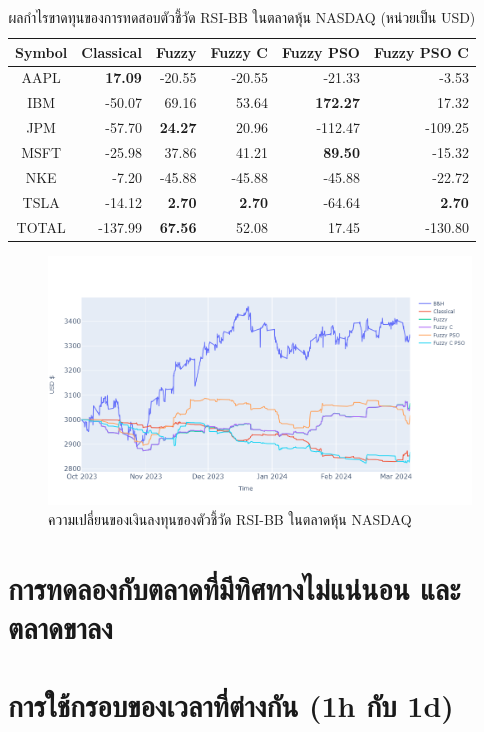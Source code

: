 \begin{table}[!ht]
    \centering
    \begin{tabular}{crrrrr}
        \hline
        \textbf{Symbol} & \textbf{Classical} & \textbf{Fuzzy} & \textbf{Fuzzy C} & \textbf{Fuzzy PSO} & \textbf{Fuzzy PSO C} \\ \hline
        AAPL            & \textbf{17.09}     & -20.55         & -20.55           & -21.33             & -3.53                \\ \hline
        IBM             & -50.07             & 69.16          & 53.64            & \textbf{172.27}    & 17.32                \\ \hline
        JPM             & -57.70             & \textbf{24.27} & 20.96            & -112.47            & -109.25              \\ \hline
        MSFT            & -25.98             & 37.86          & 41.21            & \textbf{89.50}     & -15.32               \\ \hline
        NKE             & -7.20              & -45.88         & -45.88           & -45.88             & -22.72               \\ \hline
        TSLA            & -14.12             & \textbf{2.70}  & \textbf{2.70}    & -64.64             &
        \textbf{2.70}                                                                                                        \\ \hline
        TOTAL           & -137.99            & \textbf{67.56} & 52.08            & 17.45              & -130.80              \\ \hline
    \end{tabular}
    \caption{ผลกำไรขาดทุนของการทดสอบตัวชี้วัด RSI-BB ในตลาดหุ้น NASDAQ (หน่วยเป็น USD)}
    \label{tab:rsi-bb-stocks}
\end{table}

\begin{figure}[!ht]
    \centering
    \includegraphics[width=\textwidth]{images/rsi-bb/stock-result.png}
    \caption{ความเปลี่ยนของเงินลงทุนของตัวชี้วัด RSI-BB ในตลาดหุ้น NASDAQ}
\end{figure}

\section{การทดลองกับตลาดที่มีทิศทางไม่แน่นอน และตลาดขาลง}

\section{การใช้กรอบของเวลาที่ต่างกัน (1h กับ 1d)}